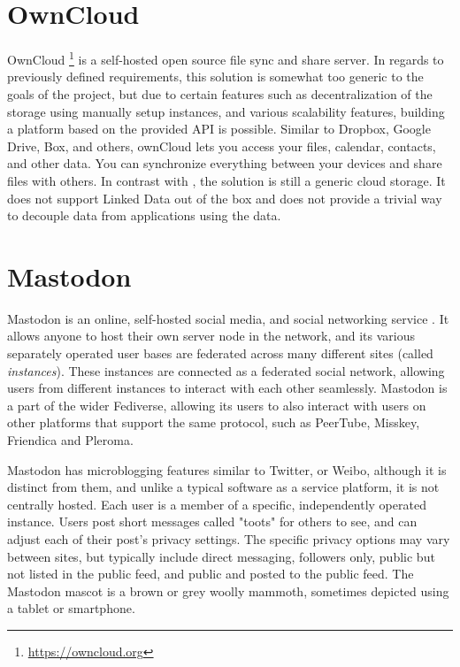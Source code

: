 \section{OwnCloud}

OwnCloud \footnote{\url{https://owncloud.org}} is a self-hosted open source file sync and share server. In regards to previously defined requirements, this solution is somewhat too generic to the goals of the project, but due to certain features such as decentralization of the storage using manually setup instances, and various scalability features, building a platform based on the provided API is possible. Similar to Dropbox, Google Drive, Box, and others, ownCloud lets you access your files, calendar, contacts, and other data. You can synchronize everything between your devices and share files with others. In contrast with \solid{}, the solution is still a generic cloud storage. It does not support Linked Data out of the box and does not provide a trivial way to decouple data from applications using the data. 

\section{Mastodon}

Mastodon is an online, self-hosted social media, and social networking service \cite{mastodon}. It allows anyone to host their own server node in the network, and its various separately operated user bases are federated across many different sites (called \textit{instances}). These instances are connected as a federated social network, allowing users from different instances to interact with each other seamlessly. Mastodon is a part of the wider Fediverse, allowing its users to also interact with users on other platforms that support the same protocol, such as PeerTube, Misskey, Friendica and Pleroma.

Mastodon has microblogging features similar to Twitter, or Weibo, although it is distinct from them, and unlike a typical software as a service platform, it is not centrally hosted. Each user is a member of a specific, independently operated instance. Users post short messages called "toots" for others to see, and can adjust each of their post's privacy settings. The specific privacy options may vary between sites, but typically include direct messaging, followers only, public but not listed in the public feed, and public and posted to the public feed. The Mastodon mascot is a brown or grey woolly mammoth, sometimes depicted using a tablet or smartphone.

